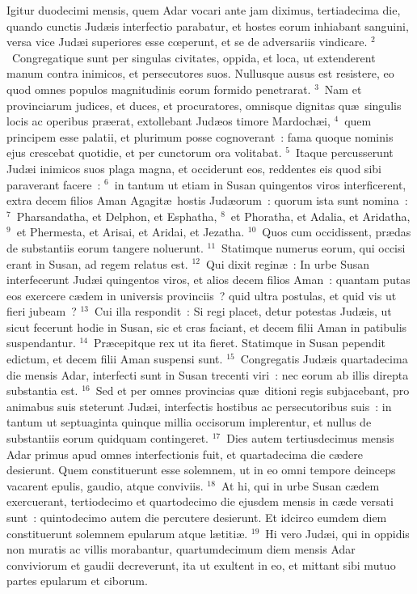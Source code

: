 \lettrine[lines=10,image=true,loversize=0.05,lraise=-0.03]{I}{}gitur duodecimi mensis, quem Adar vocari ante jam diximus, tertiadecima die, quando cunctis Jud\ae is interfectio parabatur, et hostes eorum inhiabant sanguini, versa vice Jud\ae i superiores esse cœperunt, et se de adversariis vindicare.
${}^{2}$~Congregatique sunt per singulas civitates, oppida, et loca, ut extenderent manum contra inimicos, et persecutores suos. Nullusque ausus est resistere, eo quod omnes populos magnitudinis eorum formido penetrarat.
${}^{3}$~Nam et provinciarum judices, et duces, et procuratores, omnisque dignitas qu\ae\ singulis locis ac operibus pr\ae erat, extollebant Jud\ae os timore Mardoch\ae i,
${}^{4}$~quem principem esse palatii, et plurimum posse cognoverant~: fama quoque nominis ejus crescebat quotidie, et per cunctorum ora volitabat.
${}^{5}$~Itaque percusserunt Jud\ae i inimicos suos plaga magna, et occiderunt eos, reddentes eis quod sibi paraverant facere~:
${}^{6}$~in tantum ut etiam in Susan quingentos viros interficerent, extra decem filios Aman Agagit\ae\ hostis Jud\ae orum~: quorum ista sunt nomina~:
${}^{7}$~Pharsandatha, et Delphon, et Esphatha,
${}^{8}$~et Phoratha, et Adalia, et Aridatha,
${}^{9}$~et Phermesta, et Arisai, et Aridai, et Jezatha.
${}^{10}$~Quos cum occidissent, pr\ae das de substantiis eorum tangere noluerunt.
${}^{11}$~Statimque numerus eorum, qui occisi erant in Susan, ad regem relatus est.
${}^{12}$~Qui dixit regin\ae~: In urbe Susan interfecerunt Jud\ae i quingentos viros, et alios decem filios Aman~: quantam putas eos exercere c\ae dem in universis provinciis~? quid ultra postulas, et quid vis ut fieri jubeam~?
${}^{13}$~Cui illa respondit~: Si regi placet, detur potestas Jud\ae is, ut sicut fecerunt hodie in Susan, sic et cras faciant, et decem filii Aman in patibulis suspendantur.
${}^{14}$~Pr\ae cepitque rex ut ita fieret. Statimque in Susan pependit edictum, et decem filii Aman suspensi sunt.
${}^{15}$~Congregatis Jud\ae is quartadecima die mensis Adar, interfecti sunt in Susan trecenti viri~: nec eorum ab illis direpta substantia est.
${}^{16}$~Sed et per omnes provincias qu\ae\ ditioni regis subjacebant, pro animabus suis steterunt Jud\ae i, interfectis hostibus ac persecutoribus suis~: in tantum ut septuaginta quinque millia occisorum implerentur, et nullus de substantiis eorum quidquam contingeret.
${}^{17}$~Dies autem tertiusdecimus mensis Adar primus apud omnes interfectionis fuit, et quartadecima die c\ae dere desierunt. Quem constituerunt esse solemnem, ut in eo omni tempore deinceps vacarent epulis, gaudio, atque conviviis.
${}^{18}$~At hi, qui in urbe Susan c\ae dem exercuerant, tertiodecimo et quartodecimo die ejusdem mensis in c\ae de versati sunt~: quintodecimo autem die percutere desierunt. Et idcirco eumdem diem constituerunt solemnem epularum atque l\ae titi\ae .
${}^{19}$~Hi vero Jud\ae i, qui in oppidis non muratis ac villis morabantur, quartumdecimum diem mensis Adar conviviorum et gaudii decreverunt, ita ut exultent in eo, et mittant sibi mutuo partes epularum et ciborum.


